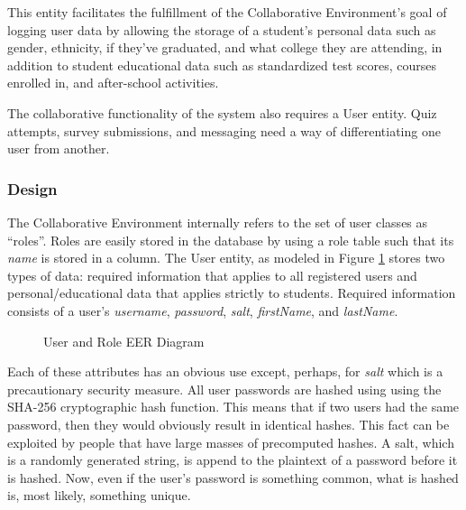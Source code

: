 	This entity facilitates the fulfillment of the Collaborative Environment's goal of logging user data by allowing the storage of a student's personal data such as gender, ethnicity, if they've graduated, and what college they are attending, in addition to student educational data such as standardized test scores, courses enrolled in, and after-school activities.

The collaborative functionality of the system also requires a User entity. Quiz attempts, survey submissions, and messaging need a way of differentiating one user from another.

\subsubsection{Design}
The Collaborative Environment internally refers to the set of user classes as ``roles''. Roles are easily stored in the database by using a role table such that its \emph{name} is stored in a column. The User entity, as modeled in Figure \ref{fig:er-user} stores two types of data: required information that applies to all registered users and personal/educational data that applies strictly to students. Required information consists of a user's \emph{username}, \emph{password}, \emph{salt}, \emph{firstName}, and \emph{lastName}.

\begin{figure}[h!]
	\centering
	\caption{User and Role EER Diagram}
	\label{fig:er-user}
\end{figure}

Each of these attributes has an obvious use except, perhaps, for \emph{salt} which is a precautionary security measure. All user passwords are hashed using using the SHA-256 cryptographic hash function. This means that if two users had the same password, then they would obviously result in identical hashes. This fact can be exploited by people that have large masses of precomputed hashes. A salt, which is a randomly generated string, is append to the plaintext of a password before it is hashed. Now, even if the user's password is something common, what is hashed is, most likely, something unique.

